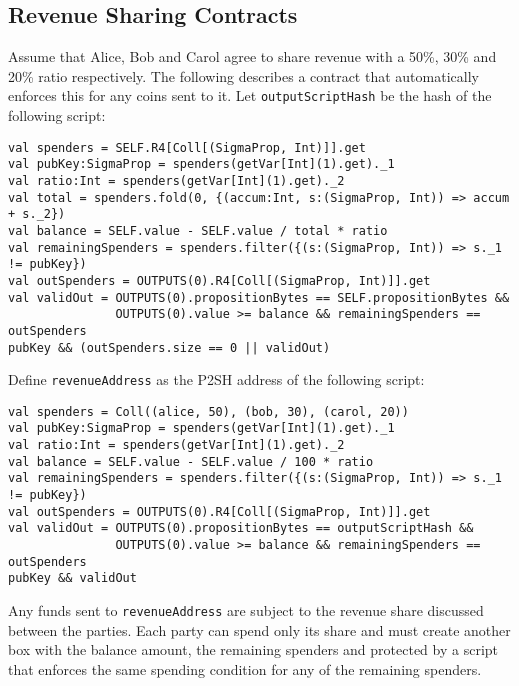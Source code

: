 \documentclass[11pt]{article}
\begin{document}
\subsection{Revenue Sharing Contracts}

Assume that Alice, Bob and Carol agree to share revenue with a 50\%, 30\% and 20\% ratio respectively. The following describes a contract that automatically enforces this for any coins sent to it. Let \texttt{outputScriptHash} be the hash of the following script:
		


\begin{verbatim}
val spenders = SELF.R4[Coll[(SigmaProp, Int)]].get
val pubKey:SigmaProp = spenders(getVar[Int](1).get)._1
val ratio:Int = spenders(getVar[Int](1).get)._2
val total = spenders.fold(0, {(accum:Int, s:(SigmaProp, Int)) => accum + s._2})
val balance = SELF.value - SELF.value / total * ratio
val remainingSpenders = spenders.filter({(s:(SigmaProp, Int)) => s._1 != pubKey})
val outSpenders = OUTPUTS(0).R4[Coll[(SigmaProp, Int)]].get
val validOut = OUTPUTS(0).propositionBytes == SELF.propositionBytes &&
               OUTPUTS(0).value >= balance && remainingSpenders == outSpenders
pubKey && (outSpenders.size == 0 || validOut)
\end{verbatim}

Define \texttt{revenueAddress} as the P2SH address of the following script: 
\begin{verbatim}
val spenders = Coll((alice, 50), (bob, 30), (carol, 20))
val pubKey:SigmaProp = spenders(getVar[Int](1).get)._1
val ratio:Int = spenders(getVar[Int](1).get)._2
val balance = SELF.value - SELF.value / 100 * ratio
val remainingSpenders = spenders.filter({(s:(SigmaProp, Int)) => s._1 != pubKey})
val outSpenders = OUTPUTS(0).R4[Coll[(SigmaProp, Int)]].get
val validOut = OUTPUTS(0).propositionBytes == outputScriptHash &&
               OUTPUTS(0).value >= balance && remainingSpenders == outSpenders
pubKey && validOut
\end{verbatim}

Any funds sent to \texttt{revenueAddress} are subject to the revenue share discussed between the parties. 
Each party can spend only its share and must create another box with the balance amount, the remaining spenders and protected by a script that enforces the same spending condition for any of the remaining spenders.
\end{document}
